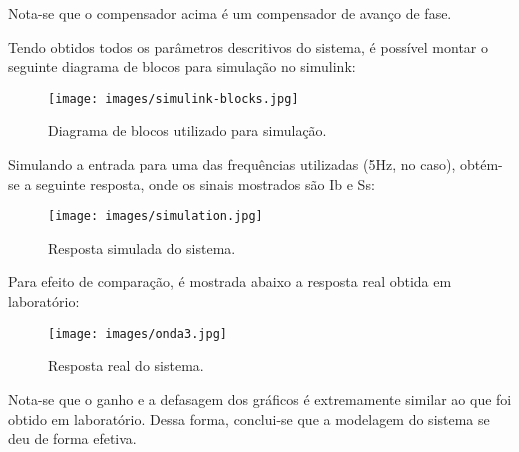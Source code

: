 Nota-se que o compensador acima é um compensador de avanço de fase.

Tendo obtidos todos os parâmetros descritivos do sistema, é possível montar o seguinte diagrama de blocos para simulação no simulink:\\

\begin{figure}[H]
\centering
\texttt{[image: images/simulink-blocks.jpg]}
\caption{Diagrama de blocos utilizado para simulação.}
\label{fig:simulink_blocks}
\end{figure}

Simulando a entrada para uma das frequências utilizadas (5Hz, no caso), obtém-se a seguinte resposta, onde os sinais mostrados são Ib e Ss:\\

\begin{figure}[H]
\centering
\texttt{[image: images/simulation.jpg]}
\caption{Resposta simulada do sistema.}
\label{fig:simulation}
\end{figure}

Para efeito de comparação, é mostrada abaixo a resposta real obtida em laboratório:\\

\begin{figure}[H]
\centering
\texttt{[image: images/onda3.jpg]}
\caption{Resposta real do sistema.}
\label{fig:simulation-real}
\end{figure}

Nota-se que o ganho e a defasagem dos gráficos é extremamente similar ao que foi obtido em laboratório. Dessa forma, conclui-se que a modelagem do sistema se deu de forma efetiva.

